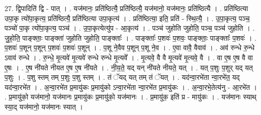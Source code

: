 \documentclass[17pt]{extarticle}
\begin{document}
27. द्वि॒पादिति॑ द्वि - पात् । . यज॑मानः॒ प्रति॑ष्ठित्यै॒ प्रति॑ष्ठित्यै॒ यज॑मानो॒ यज॑मानः॒ प्रति॑ष्ठित्यै । . प्रति॑ष्ठित्या उपा॒कृ त्यो॑पा॒कृत्य॒ प्रति॑ष्ठित्यै॒ प्रति॑ष्ठित्या उपा॒कृत्य॑ । . प्रति॑ष्ठित्या॒ इति॒ प्रति॑ - स्थि॒त्यै॒ । . उ॒पा॒कृत्य॒ पञ्च॒ पञ्चो॑ पा॒कृ त्यो॑पा॒कृत्य॒ पञ्च॑ । . उ॒पा॒कृत्येत्यु॑प - आ॒कृत्य॑ । . पञ्च॑ जुहोति जुहोति॒ पञ्च॒ पञ्च॑ जुहोति । . जु॒हो॒ति॒ पाङ्क्ताः॒ पाङ्क्ता॑ जुहोति जुहोति॒ पाङ्क्ताः᳚ । . पाङ्क्ताः᳚ प॒शवः॑ प॒शवः॒ पाङ्क्ताः॒ पाङ्क्ताः᳚ प॒शवः॑ । . प॒शवः॑ प॒शून् प॒शून् प॒शवः॑ प॒शवः॑ प॒शून् । . प॒शू ने॒वैव प॒शून् प॒शू ने॒व । . ए॒वा वावै॒ वैवाव॑ । . अव॑ रुन्धे रु॒न्धे ऽवाव॑ रुन्धे । . रु॒न्धे॒ मृ॒त्यवे॑ मृ॒त्यवे॑ रुन्धे रुन्धे मृ॒त्यवे᳚ । . मृ॒त्यवे॒ वै वै मृ॒त्यवे॑ मृ॒त्यवे॒ वै । . वा ए॒ष ए॒ष वै वा ए॒षः । . ए॒ष नी॑यते नीयत ए॒ष ए॒ष नी॑यते । . नी॒य॒ते॒ यद् यन् नी॑यते नीयते॒ यत् । . यत् प॒शुः प॒शुर् यद् यत् प॒शुः । . प॒शु स्तम् तम् प॒शुः प॒शु स्तम् । . तं ॅयद् यत् तम् तं ॅयत् । . यद॑न्वा॒रभे॑ता न्वा॒रभे॑त॒ यद् यद॑न्वा॒रभे॑त । . अ॒न्वा॒रभे॑त प्र॒मायु॑कः प्र॒मायु॑को ऽन्वा॒रभे॑ता न्वा॒रभे॑त प्र॒मायु॑कः । . अ॒न्वा॒रभे॒तेत्य॑नु - आ॒रभे॑त । . प्र॒मायु॑को॒ यज॑मानो॒ यज॑मानः प्र॒मायु॑कः प्र॒मायु॑को॒ यज॑मानः । . प्र॒मायु॑क॒ इति॑ प्र - मायु॑कः । . यज॑मानः स्याथ् स्या॒द् यज॑मानो॒ यज॑मानः स्यात् । \newline
\end{document}
